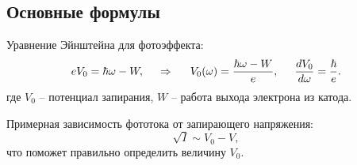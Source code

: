 \subsection*{Основные формулы}


Уравнение Эйнштейна для фотоэффекта:
\begin{equation}
    e V_0 = \hbar \omega  - W,
    \hspace{0.5cm} \Rightarrow \hspace{0.5cm}
    V_0 (\omega) = \frac{\hbar \omega - W}{e},
    \hspace{5 mm} 
    \frac{d V_0}{d \omega} = \frac{\hbar}{e}.
    \label{einst_eq}
\end{equation}
где $V_0$ -- потенциал запирания, $W$ -- работа выхода электрона из катода.

Примерная зависимость фототока от запирающего напряжения:
\begin{equation}
    \sqrt{I} \sim V_0 - V,
    \label{approx}
\end{equation}
что поможет правильно определить величину $V_0$.
